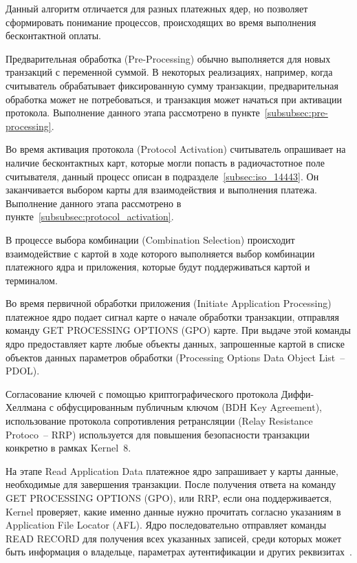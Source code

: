 Данный алгоритм отличается для разных платежных ядер, но позволяет сформировать понимание процессов, происходящих во время выполнения бесконтактной оплаты.

Предварительная обработка (Pre-Processing) обычно выполняется для новых транзакций с переменной суммой.
В некоторых реализациях, например, когда считыватель обрабатывает фиксированную сумму транзакции, предварительная обработка может не потребоваться, и транзакция может начаться при активации протокола.
Выполнение данного этапа рассмотрено в пункте~\ref{subsubsec:pre-processing}.

Во время активация протокола (Protocol Activation) считыватель опрашивает на наличие бесконтактных карт, которые могли попасть в радиочастотное поле считывателя, данный процесс описан в подразделе~\ref{subsec:iso_14443}.
Он заканчивается выбором карты для взаимодействия и выполнения платежа.
Выполнение данного этапа рассмотрено в пункте~\ref{subsubsec:protocol_activation}.

В процессе выбора комбинации (Combination Selection) происходит взаимодействие с картой в ходе которого выполняется выбор комбинации платежного ядра и приложения, которые будут поддерживаться картой и терминалом.

Во время первичной обработки приложения (Initiate Application Processing) платежное ядро подает сигнал карте о начале обработки транзакции, отправляя команду GET PROCESSING OPTIONS (GPO) карте.
При выдаче этой команды ядро предоставляет карте любые объекты данных, запрошенные картой в списке объектов данных параметров обработки (Processing Options Data Object List~-- PDOL).

Согласование ключей с помощью криптографического протокола Диффи-Хеллмана с обфусцированным публичным ключом (BDH Key Agreement), использование протокола сопротивления ретрансляции (Relay Resistance Protoco~-- RRP) используется для повышения безопасности транзакции конкретно в рамках Kernel~8.

На этапе Read Application Data платежное ядро запрашивает у карты данные, необходимые для завершения транзакции.
После получения ответа на команду GET PROCESSING OPTIONS (GPO), или RRP, если она поддерживается, Kernel проверяет, какие именно данные нужно прочитать согласно указаниям в Application File Locator (AFL).
Ядро последовательно отправляет команды READ RECORD для получения всех указанных записей, среди которых может быть информация о владельце, параметрах аутентификации и других реквизитах~\cite{emv_book_c8}.

